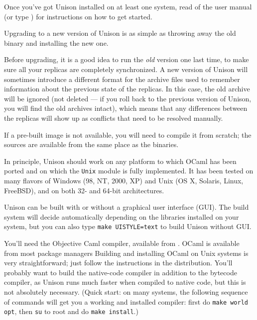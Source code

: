 \documentclass{article}
\begin{document}

Once you've got Unison installed on at least one system, read
 of the user manual (or type ) for instructions on how to get started.



Upgrading to a new version of Unison is as simple as throwing away the old
binary and installing the new one.

Before upgrading, it is a good idea to run the {\em old} version one last
time, to make sure all your replicas are completely synchronized.  A new
version of Unison will sometimes introduce a different format for the
archive files used to remember information about the previous state of the
replicas.  In this case, the old archive will be ignored (not deleted --- if
you roll back to the previous version of Unison, you will find the old
archives intact), which means that any differences between the replicas will
show up as conflicts that need to be resolved manually.



If a pre-built image is not available, you will need to compile it from
scratch; the sources are available from the same place as the binaries.

In principle, Unison should work on any platform to which OCaml has been
ported and on which the \verb|Unix| module is fully implemented.  It has
been tested on many flavors of Windows (98, NT, 2000, XP) and Unix (OS X,
Solaris, Linux, FreeBSD), and on both 32- and 64-bit architectures.



Unison can be built with or without a graphical user interface (GUI). The
build system will decide automatically depending on the libraries installed
on your system, but you can also type {\tt make UISTYLE=text} to build
Unison without GUI.

You'll need the Objective Caml compiler,
available from .  OCaml is available from most
package managers
Building and installing OCaml
on Unix systems is very straightforward; just follow the instructions in the
distribution.  You'll probably want to build the native-code compiler in
addition to the bytecode compiler, as Unison runs much faster when compiled
to native code, but this is not absolutely necessary.
%
(Quick start: on many systems, the following sequence of commands will
get you a working and installed compiler: first do {\tt make world opt},
then {\tt su} to root and do {\tt make install}.)
\end{document}
